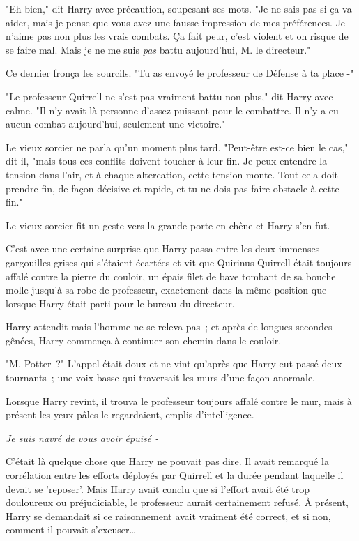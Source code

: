 "Eh bien," dit Harry avec précaution, soupesant ses mots. "Je ne sais pas si ça va aider, mais je pense que vous avez une fausse impression de mes préférences. Je n'aime pas non plus les vrais combats. Ça fait peur, c'est violent et on risque de se faire mal. Mais je ne me suis \emph{pas} battu aujourd'hui, M. le directeur."

Ce dernier fronça les sourcils. "Tu as envoyé le professeur de Défense à ta place -"

"Le professeur Quirrell ne s'est pas vraiment battu non plus," dit Harry avec calme. "Il n'y avait là personne d'assez puissant pour le combattre. Il n'y a eu aucun combat aujourd'hui, seulement une victoire."

Le vieux sorcier ne parla qu'un moment plus tard. "Peut-être est-ce bien le cas," dit-il, "mais tous ces conflits doivent toucher à leur fin. Je peux entendre la tension dans l'air, et à chaque altercation, cette tension monte. Tout cela doit prendre fin, de façon décisive et rapide, et tu ne dois pas faire obstacle à cette fin."

Le vieux sorcier fit un geste vers la grande porte en chêne et Harry s'en fut.

\later

C'est avec une certaine surprise que Harry passa entre les deux immenses gargouilles grises qui s'étaient écartées et vit que Quirinus Quirrell était toujours affalé contre la pierre du couloir, un épais filet de bave tombant de sa bouche molle jusqu'à sa robe de professeur, exactement dans la même position que lorsque Harry était parti pour le bureau du directeur.

Harry attendit mais l'homme ne se releva pas~; et après de longues secondes gênées, Harry commença à continuer son chemin dans le couloir.

"M. Potter~?" L'appel était doux et ne vint qu'après que Harry eut passé deux tournants~; une voix basse qui traversait les murs d'une façon anormale.

Lorsque Harry revint, il trouva le professeur toujours affalé contre le mur, mais à présent les yeux pâles le regardaient, emplis d'intelligence.

\emph{Je suis navré de vous avoir épuisé -}

C'était là quelque chose que Harry ne pouvait pas dire. Il avait remarqué la corrélation entre les efforts déployés par Quirrell et la durée pendant laquelle il devait se 'reposer'. Mais Harry avait conclu que si l'effort avait été trop douloureux ou préjudiciable, le professeur aurait certainement refusé. À présent, Harry se demandait si ce raisonnement avait vraiment été correct, et si non, comment il pouvait s'excuser…

